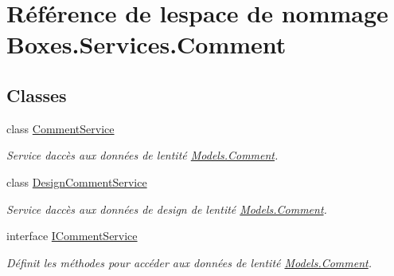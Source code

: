 \hypertarget{namespace_boxes_1_1_services_1_1_comment}{}\section{Référence de l\textquotesingle{}espace de nommage Boxes.\+Services.\+Comment}
\label{namespace_boxes_1_1_services_1_1_comment}
\subsection*{Classes}
\begin{DoxyCompactItemize}
\item 
class \hyperlink{class_boxes_1_1_services_1_1_comment_1_1_comment_service}{Comment\+Service}
\begin{DoxyCompactList}\small\item\em Service d\textquotesingle{}accès aux données de l\textquotesingle{}entité \hyperlink{class_boxes_1_1_models_1_1_comment}{Models.\+Comment}. \end{DoxyCompactList}\item 
class \hyperlink{class_boxes_1_1_services_1_1_comment_1_1_design_comment_service}{Design\+Comment\+Service}
\begin{DoxyCompactList}\small\item\em Service d\textquotesingle{}accès aux données de design de l\textquotesingle{}entité \hyperlink{class_boxes_1_1_models_1_1_comment}{Models.\+Comment}. \end{DoxyCompactList}\item 
interface \hyperlink{interface_boxes_1_1_services_1_1_comment_1_1_i_comment_service}{I\+Comment\+Service}
\begin{DoxyCompactList}\small\item\em Définit les méthodes pour accéder aux données de l\textquotesingle{}entité \hyperlink{class_boxes_1_1_models_1_1_comment}{Models.\+Comment}. \end{DoxyCompactList}\end{DoxyCompactItemize}
